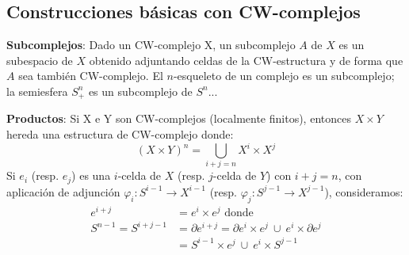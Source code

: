 \subsection{Construcciones básicas con CW-complejos}
\textbf{Subcomplejos}: Dado un CW-complejo X, un subcomplejo $A$ de $X$ es un subespacio de $X$ obtenido adjuntando celdas de la CW-estructura y de forma que $A$ sea también CW-complejo. El $n$-esqueleto de un complejo es un subcomplejo; la semiesfera $S_+^n$ es un subcomplejo de $S^n$... \par 
\textbf{Productos}:  Si X e Y son CW-complejos (localmente finitos), entonces $X \times Y$ hereda una estructura de CW-complejo donde:
\[ (X \times Y)^n = \bigcup_{i+j=n} X^i \times X^j \]
Si $e_i$ (resp. $e_j$) es una $i$-celda de $X$ (resp. $j$-celda de $Y$) con $i+j=n$, con aplicación de adjunción $\varphi_i : S^{i-1} \longrightarrow X^{i-1}$ (resp. $\varphi_j : S^{j-1} \longrightarrow X^{j-1}$), consideramos:
\begin{align*} 
e^{i+j} &= e^i \times e^j \text{ donde } \\
S^{n-1} = S^{i+j-1} &= \partial e^{i+j} = \partial e^i \times e^j \ \cup \ e^i \times \partial e^j \\
&= S^{i-1} \times e^j \ \cup \ e^i \times S^{j-1}
\end{align*}

